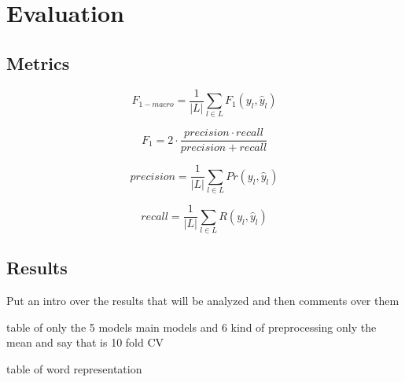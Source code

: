 \section{Evaluation} \label{sec:evaluation}

\subsection{Metrics}

\begin{equation}
F_{1-macro} = \frac{1}{|L|} \displaystyle\sum_{l\in L} F_1(y_l, \hat{y}_l)
\end{equation}

\begin{equation}
F_1 = 2 \cdot \frac{precision \cdot recall }{precision + recall}
\end{equation}

\begin{equation}
precision = \frac{1}{|L|} \displaystyle\sum_{l\in L} Pr(y_l, \hat{y}_l)
\end{equation}

\begin{equation}
recall = \frac{1}{|L|} \displaystyle\sum_{l\in L} R(y_l, \hat{y}_l)
\end{equation}


\subsection{Results}

Put an intro over the results that will be analyzed and then comments over them

table of only the 5 models main models and 6 kind of preprocessing
only the mean and say that is 10 fold CV

table of word representation




